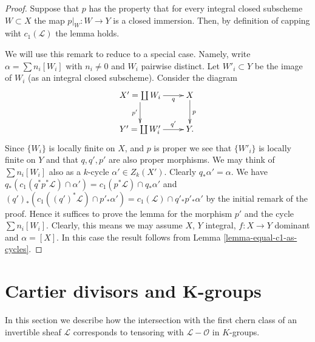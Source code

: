 \begin{proof}
Suppose that $p$ has the property that for every integral
closed subscheme $W \subset X$ the map $p|_W : W \to Y$
is a closed immersion. Then, by definition of capping
wiht $c_1(\mathcal{L})$ the lemma holds.

\medskip\noindent
We will use this remark to reduce to a special case. Namely,
write $\alpha = \sum n_i[W_i]$ with $n_i \not = 0$ and $W_i$ pairwise
distinct. Let $W'_i \subset Y$ be the image of $W_i$ (as an integral
closed subscheme). Consider the diagram
$$
\xymatrix{
X' = \coprod W_i \ar[r]_-q \ar[d]_{p'} & X \ar[d]^p \\
Y' = \coprod W'_i \ar[r]^-{q'} & Y.
}
$$
Since $\{W_i\}$ is locally finite on $X$, and $p$ is proper
we see that $\{W'_i\}$ is locally finite on $Y$ and that
$q, q', p'$ are also proper morphisms.
We may think of $\sum n_i[W_i]$ also as a $k$-cycle
$\alpha' \in Z_k(X')$. Clearly $q_*\alpha' = \alpha$.
We have
$q_*(c_1(q^*p^*\mathcal{L}) \cap \alpha')
= c_1(p^*\mathcal{L}) \cap q_*\alpha'$
and
$(q')_*(c_1((q')^*\mathcal{L}) \cap p'_*\alpha') =
c_1(\mathcal{L}) \cap q'_*p'_*\alpha'$ by the initial
remark of the proof. Hence it suffices to prove the lemma
for the morphism $p'$ and the cycle $\sum n_i[W_i]$.
Clearly, this means we may assume $X$, $Y$ integral,
$f : X \to Y$ dominant and $\alpha = [X]$.
In this case the result follows from
Lemma \ref{lemma-equal-c1-as-cycles}.
\end{proof}














\section{Cartier divisors and K-groups}
\label{section-cartier-coherent}

\noindent
In this section we describe how the intersection with the
first chern class of an invertible sheaf $\mathcal{L}$
corresponds to tensoring with $\mathcal{L} - \mathcal{O}$
in $K$-groups.

